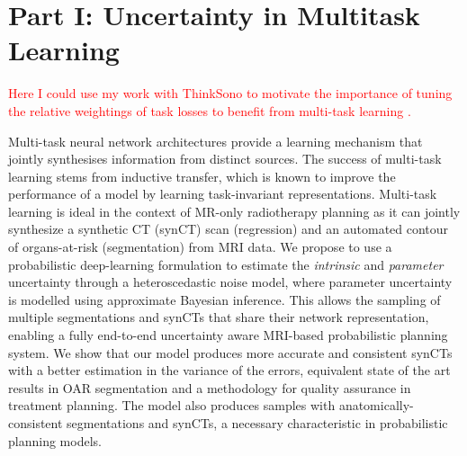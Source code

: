 
\chapter{Part I: Uncertainty in Multitask Learning}
\label{chapter:multitaskuncertainty_part1}

\textcolor{red}{Here I could use my work with ThinkSono to motivate the importance of tuning the relative weightings of task losses to benefit from multi-task learning \cite{tanno2018autodvt}.}

Multi-task neural network architectures provide a learning mechanism that jointly synthesises information from distinct sources. The success of multi-task learning stems from inductive transfer, which is known to improve the performance of a model by learning task-invariant representations. Multi-task learning is ideal in the context of MR-only radiotherapy planning as it can jointly synthesize a synthetic CT (synCT) scan (regression) and an automated contour of organs-at-risk (segmentation) from MRI data. We propose to use a probabilistic deep-learning formulation to estimate the \textit{intrinsic} and \textit{parameter} uncertainty through a heteroscedastic noise model, where parameter uncertainty is modelled using approximate Bayesian inference. This allows the sampling of multiple segmentations and synCTs that share their network representation, enabling a fully end-to-end uncertainty aware MRI-based probabilistic planning system. We show that our model produces more accurate and consistent synCTs with a better estimation in the variance of the errors, equivalent state of the art results in OAR segmentation and a methodology for quality assurance in treatment planning. The model also produces samples with anatomically-consistent segmentations and synCTs, a necessary characteristic in probabilistic planning models. 

